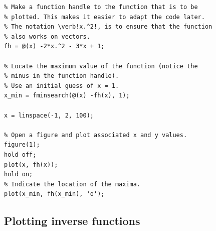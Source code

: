\documentclass[12pt,a4paper]{article}
\newcounter{ex}
\numberwithin{ex}{section}
\begin{document}
%
%
%
%
%
%
%
%
%
%
%
%
%
%

\begin{lstlisting}
% Make a function handle to the function that is to be
% plotted. This makes it easier to adapt the code later.
% The notation \verb!x.^2!, is to ensure that the function
% also works on vectors.
fh = @(x) -2*x.^2 - 3*x + 1;

% Locate the maximum value of the function (notice the
% minus in the function handle). 
% Use an initial guess of x = 1.
x_min = fminsearch(@(x) -fh(x), 1);

x = linspace(-1, 2, 100);

% Open a figure and plot associated x and y values.
figure(1);
hold off;
plot(x, fh(x));
hold on;
% Indicate the location of the maxima.
plot(x_min, fh(x_min), 'o');
\end{lstlisting}


%
%
%
%
%
%



\subsection{Plotting inverse functions}
\end{document}
